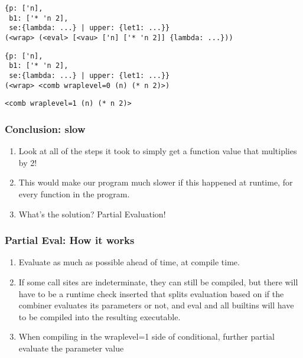 \documentclass{beamer}
\begin{document}
\begin{frame}[fragile]
\footnotesize
\begin{verbatim}
{p: ['n],
 b1: ['* 'n 2],
 se:{lambda: ...} | upper: {let1: ...}}
(<wrap> (<eval> [<vau> ['n] ['* 'n 2]] {lambda: ...}))
\end{verbatim}
\end{frame}

\begin{frame}[fragile]
\footnotesize
\begin{verbatim}
{p: ['n],
 b1: ['* 'n 2],
 se:{lambda: ...} | upper: {let1: ...}}
(<wrap> <comb wraplevel=0 (n) (* n 2)>)
\end{verbatim}
\end{frame}

\begin{frame}[fragile]
\footnotesize
\begin{verbatim}
<comb wraplevel=1 (n) (* n 2)>
\end{verbatim}
\end{frame}

\begin{frame}
\frametitle{Conclusion: slow}
  \begin{enumerate}
	\item<1-> Look at all of the steps it took to simply get a function value that multiplies by 2!
    \item<2-> This would make our program much slower if this happened at runtime, for every function in the program.
	\item<3-> What's the solution? Partial Evaluation!
  \end{enumerate}
\end{frame}

\begin{frame}
\frametitle{Partial Eval: How it works}
  \begin{enumerate}
	\item<1-> Evaluate as much as possible ahead of time, at compile time.
	\item<2-> If some call sites are indeterminate, they can still be compiled, but there will have to be a runtime check inserted that splits evaluation based on if the combiner evaluates its parameters or not, and eval and all builtins will have to be compiled into the resulting executable.
    \item<3-> When compiling in the wraplevel=1 side of conditional, further partial evaluate the parameter value
  \end{enumerate}
\end{frame}
\end{document}
